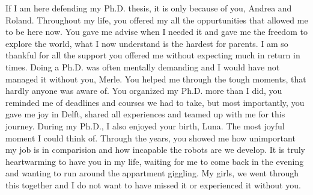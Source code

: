 If I am here defending my Ph.D. thesis, it is only because of you, Andrea and
Roland. Throughout my life, you offered my all the oppurtunities that allowed
me to be here now. You gave me advise when I needed it and gave me the freedom
to explore the world, what I now understand is the hardest for parents. I am so
thankful for all the support you offered me without expecting much in return in
times. Doing a Ph.D. was often mentally demanding and I would have not managed
it without you, Merle. You helped me through the tough moments, that hardly
anyone was aware of. You organized my Ph.D. more than I did, you reminded me of
deadlines and courses we had to take, but most importantly, you gave me joy in
Delft, shared all experiences and teamed up with me for this journey. During my
Ph.D., I also enjoyed your birth, Luna. The most joyful moment I could think
of. Through the years, you showed me how unimportant my job is in comparision
and how incapable the robots are we develop. It is truly heartwarming to have
you in my life, waiting for me to come back in the evening and wanting to run
around the appartment giggling. My girls, we went through this together and I
do not want to have missed it or experienced it without you. 






